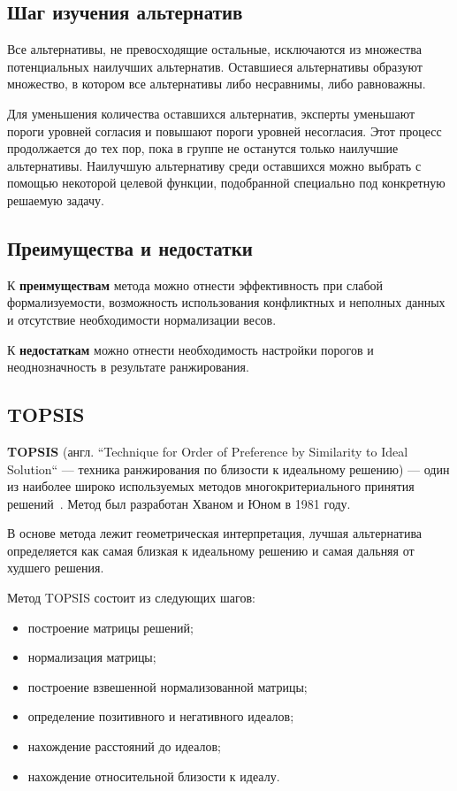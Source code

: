 \subsection*{Шаг изучения альтернатив}

Все альтернативы, не превосходящие остальные, исключаются из множества потенциальных наилучших альтернатив.
Оставшиеся альтернативы образуют множество, в котором все альтернативы либо несравнимы, либо равноважны.

Для уменьшения количества оставшихся альтернатив, эксперты уменьшают пороги уровней согласия и повышают пороги уровней несогласия.
Этот процесс продолжается до тех пор, пока в группе не останутся только наилучшие альтернативы.
Наилучшую альтернативу среди оставшихся можно выбрать с помощью некоторой целевой функции, подобранной специально под конкретную решаемую задачу.

\subsection*{Преимущества и недостатки}

К \textbf{преимуществам} метода можно отнести эффективность при слабой формализуемости, возможность использования конфликтных и неполных данных и отсутствие необходимости нормализации весов.

К \textbf{недостаткам} можно отнести необходимость настройки порогов и неоднозначность в результате ранжирования.

\subsection{TOPSIS}

\textbf{TOPSIS} (англ. ``Technique for Order of Preference by Similarity to Ideal Solution`` --- техника ранжирования по близости к идеальному решению) --- один из наиболее широко используемых методов многокритериального принятия решений~\cite{TOPSIS}.
Метод был разработан Хваном и Юном в 1981 году.

В основе метода лежит геометрическая интерпретация, лучшая альтернатива определяется как самая близкая к идеальному решению и самая дальняя от худшего решения.

Метод TOPSIS состоит из следующих шагов:
\begin{itemize} 
    \item построение матрицы решений;
    \item нормализация матрицы;
    \item построение взвешенной нормализованной матрицы;
    \item определение позитивного и негативного идеалов;
    \item нахождение расстояний до идеалов;
    \item нахождение относительной близости к идеалу.
\end{itemize}

